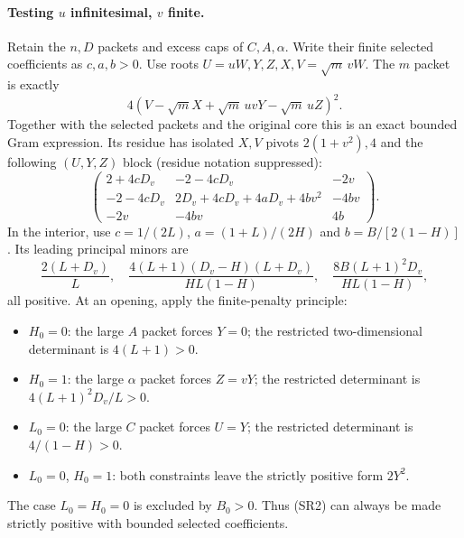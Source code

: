 \paragraph{Testing $u$ infinitesimal, $v$ finite.}
Retain the $n,D$ packets and excess caps of $C,A,\alpha$.
Write their finite selected coefficients as $c,a,b>0$. Use roots
$U=uW,Y,Z,X,V=\sqrt m\,vW$. The $m$ packet is exactly
\[
 4(V-\sqrt m X+\sqrt m\,uvY-\sqrt m\,uZ)^2.
\]
Together with the selected packets and the original core this is an
exact bounded Gram expression. Its residue has isolated $X,V$ pivots
$2(1+v^2),4$ and the following $(U,Y,Z)$ block (residue notation suppressed):
\[
 \begin{pmatrix}
 2+4cD_v&-2-4cD_v&-2v\\
 -2-4cD_v&2D_v+4cD_v+4aD_v+4bv^2&-4bv\\
 -2v&-4bv&4b
 \end{pmatrix}.
\tag{SR2}
\]
In the interior, use $c=1/(2L)$, $a=(1+L)/(2H)$ and
$b=B/[2(1-H)]$. Its leading principal minors are
\[
 \frac{2(L+D_v)}L,\quad
 \frac{4(L+1)(D_v-H)(L+D_v)}{HL(1-H)},\quad
 \frac{8B(L+1)^2D_v}{HL(1-H)},
\tag{SR3}
\]
all positive. At an opening, apply the finite-penalty principle:
\begin{itemize}
\item $H_0=0$: the large $A$ packet forces $Y=0$; the restricted
      two-dimensional determinant is $4(L+1)>0$.
\item $H_0=1$: the large $\alpha$ packet forces $Z=vY$; the restricted
      determinant is $4(L+1)^2D_v/L>0$.
\item $L_0=0$: the large $C$ packet forces $U=Y$; the restricted
      determinant is $4/(1-H)>0$.
\item $L_0=0$, $H_0=1$: both constraints leave the strictly positive
      form $2Y^2$.
\end{itemize}
The case $L_0=H_0=0$ is excluded by $B_0>0$. Thus (SR2) can always be
made strictly positive with bounded selected coefficients.

